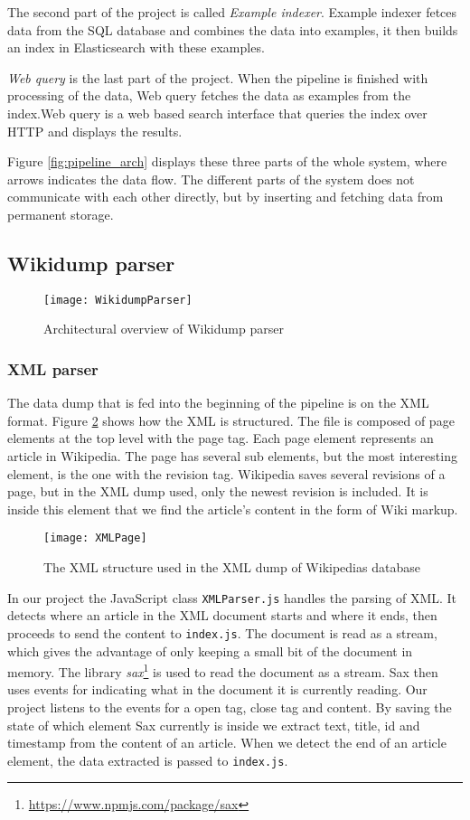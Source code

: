 The second part of the project is called \textit{Example indexer}. Example indexer fetces data from the SQL database and combines the data into examples, it then builds an index in Elasticsearch with these examples.

\textit{Web query} is the last part of the project. When the pipeline is finished with processing of the data, Web query fetches the data as examples from the index.Web query is a web based search interface that queries the index over HTTP and displays the results.

Figure \ref{fig:pipeline_arch} displays these three parts of the whole system, where arrows indicates the data flow. The different parts of the system does not communicate with each other directly, but by inserting and fetching data from permanent storage. 


\subsection{Wikidump parser}

\begin{figure}[h]
\caption{Architectural overview of Wikidump parser}
\texttt{[image: WikidumpParser]}
\label{fig:wikidump_parser}
\end{figure}

\subsubsection{XML parser}

The data dump that is fed into the beginning of the pipeline is on the XML format. Figure \ref{fig:xml} shows how the XML is structured. The file is composed of page elements at the top level with the page tag. Each page element represents an article in Wikipedia. The page has several sub elements, but the most interesting element, is the one with the revision tag. Wikipedia saves several revisions of a page, but in the XML dump used, only the newest revision is included. It is inside this element that we find the article's content in the form of Wiki markup.

\begin{figure}[h]
\caption{The XML structure used in the XML dump of Wikipedias database}
\texttt{[image: XMLPage]}
\label{fig:xml}
\end{figure}

In our project the JavaScript class \texttt{XMLParser.js} handles the parsing of XML. It detects where an article in the XML document starts and where it ends, then proceeds to send the content to \texttt{index.js}. The document is read as a stream, which gives the advantage of only keeping a small bit of the document in memory. The library \textit{sax}\footnote{\url{https://www.npmjs.com/package/sax}} is used to read the document as a stream. Sax then uses events for indicating what in the document it is currently reading. Our project listens to the events for a open tag, close tag and content. By saving the state of which element Sax currently is inside we extract text, title, id and timestamp from the content of an article. When we detect the end of an article element, the data extracted is passed to \texttt{index.js}.

